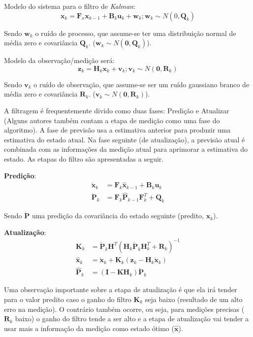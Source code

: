 Modelo do sistema para o filtro de \emph{Kalman}:
\begin{equation}
\textbf{x}_k = \textbf{F}_x \textbf{x}_{k-1} + \textbf{B}_k \textbf{u}_k + \textbf{w}_k; \textbf{w}_k \sim N(0, \textbf{Q}_k)
\end{equation}

Sendo $\textbf{w}_k$ o ruído de processo, que assume-se ter uma distribuição normal de média zero e covariância $\textbf{Q}_k$. ($\textbf{w}_k \sim N(\textbf{0}, \textbf{Q}_k)$).

Modelo da observação/medição será:
\begin{equation}
\textbf{z}_k = \textbf{H}_k \textbf{x}_k + \textbf{v}_k; \textbf{v}_k \sim N(\textbf{0}, \textbf{R}_k)
\end{equation}

Sendo $\textbf{v}_k$ o ruído de observação, que assume-se ser um ruído gaussiano branco de média zero e covariância $\textbf{R}_k$. ($\textbf{v}_k \sim N(\textbf{0}, \textbf{R}_k)$).

A filtragem é frequentemente divido como duas fases: Predição e Atualizar (Alguns autores também contam a etapa de medição como uma fase do algoritmo). A fase de previsão usa a estimativa anterior para produzir uma estimativa do estado atual. Na fase seguinte (de atualização), a previsão atual é combinada com as informações da medição atual para aprimorar a estimativa do estado. As etapas do filtro são apresentadas a seguir.

\textbf{Predição}:
\begin{align*}
    \check{\textbf{x}}_k &= \textbf{F}_k \hat{\textbf{x}}_{k-1} + \textbf{B}_k \textbf{u}_k\\
    \check{\textbf{P}}_k &= \textbf{F}_k \hat{\textbf{P}}_{k-1} \textbf{F}^T_k + \textbf{Q}_k
\end{align*}

Sendo $\check{\textbf{P}}$ uma predição da covariância do estado seguinte (predito, $\textbf{x}_k$).

\textbf{Atualização}:
\begin{align*}
    \textbf{K}_k &= \check{\textbf{P}}_k \textbf{H}^T \left( \textbf{H}_k \check{\textbf{P}}_k \textbf{H}^T_k + \textbf{R}_k\right)^{-1}\\
    \hat{\textbf{x}}_k &= \check{\textbf{x}}_k + \textbf{K}_k\left( \textbf{z}_k - \textbf{H}_k \check{\textbf{x}}_k \right)\\
    \hat{\textbf{P}}_k &= \left(\textbf{I} - \textbf{KH}_k \right)\check{\textbf{P}}_k
\end{align*}

Uma observação importante sobre a etapa de atualização é que ela irá tender para o valor predito caso o ganho do filtro $\textbf{K}_k$ seja baixo (resultado de um alto erro na medição). O contrário também ocorre, ou seja, para medições precisas ($\textbf{R}_k$ baixo) o ganho do filtro tende a ser alto e a etapa de atualização vai tender a usar mais a informação da medição como estado ótimo ($\hat{\textbf{x}}$). 
